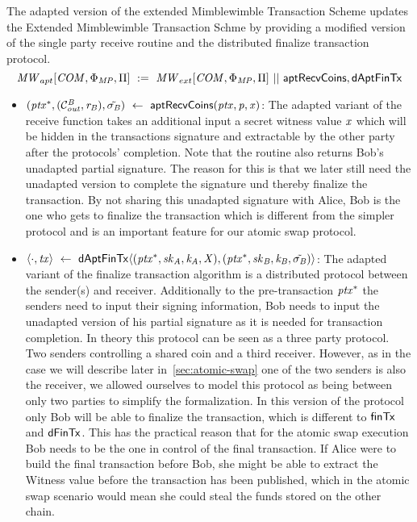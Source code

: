 \begin{definition}
    \label{def:apt-ext-mw-tx-scheme}
    The adapted version of the extended Mimblewimble Transaction Scheme updates the Extended Mimblewimble Transaction Schme by providing a modified version of the single party receive routine and the distributed finalize transaction protocol.
    \[ \mathit{MW}_{apt}[\mathit{COM},\Phi_{\mathit{MP}},\Pi] ~:=~ \mathit{MW}_{ext}[\mathit{COM},\Phi_{\mathit{MP}},\Pi] ~||~ \mathsf{aptRecvCoins}, \mathsf{dAptFinTx} \]
    \begin{itemize}
        \item $(\mathit{ptx}^*, (\mathcal{C}_{\mathit{out}}^{\mathit{B}},\mathit{r}_{\mathit{B}}), \tilde{\sigma_{\mathit{B}}}) ~\leftarrow~ \mathsf{aptRecvCoins}(\mathit{ptx},\mathit{p},\mathit{x})$: The adapted variant of the receive function takes an additional input a secret witness value
        $\mathit{x}$ which will be hidden in the transactions signature and extractable by the other party after the protocols' completion.
        Note that the routine also returns Bob's unadapted partial signature.
        The reason for this is that we later still need the unadapted version to complete the signature und thereby finalize the transaction.
        By not sharing this unadapted signature with Alice, Bob is the one who gets to finalize the transaction which is different from the simpler protocol and is an important feature for our atomic swap protocol.
        \item $\langle \cdot, \mathit{tx} \rangle ~\leftarrow~ \mathsf{dAptFinTx} \langle (\mathit{ptx}^*,\mathit{sk}_{\mathit{A}},\mathit{\mathit{k}_{\mathit{A}}},\mathit{X}), (\mathit{ptx}^*,\mathit{sk}_{\mathit{B}},\mathit{\mathit{k}_{\mathit{B}}},\tilde{\sigma_{\mathit{B}}}) \rangle$: The adapted variant of the finalize transaction algorithm is a distributed protocol between the sender(s) and receiver.
        Additionally to the pre-transaction $\mathit{ptx}^*$ the senders need to input their signing information, Bob needs to input the unadapted version of his partial signature as it is needed for transaction completion.
        In theory this protocol can be seen as a three party protocol.
        Two senders controlling a shared coin and a third receiver.
        However, as in the case we will describe later in~\ref{sec:atomic-swap} one of the two senders is also the receiver, we allowed ourselves to model this protocol as being between only two parties to simplify the formalization.
        In this version of the protocol only Bob will be able to finalize the transaction, which is different to $\mathsf{finTx}$ and $\mathsf{dFinTx}$.
        This has the practical reason that for the atomic swap execution Bob needs to be the one in control of the final transaction.
        If Alice were to build the final transaction before Bob, she might be able to extract the Witness value before the transaction has been published, which in the atomic swap scenario would mean she could steal the funds stored on the other chain.
    \end{itemize}
\end{definition}

